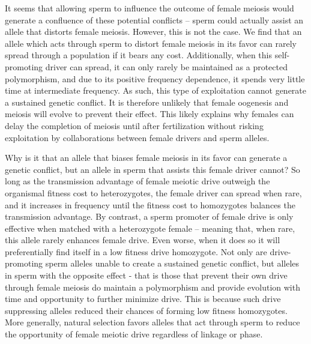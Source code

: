 \documentclass{pnastwo}
\begin{document}
\begin{article}
It seems that allowing sperm to influence the outcome of female meiosis would generate a confluence of these potential conflicts -- 
	sperm could actually assist an allele that distorts female meiosis.
However, this is not the case.
We find that an allele which acts through sperm to distort female meiosis in its favor 
	can rarely spread through a population if it bears any cost. 
Additionally, when this self-promoting driver can spread, it can only rarely 
	be maintained as a protected polymorphism, and due to its positive frequency dependence,  
	it spends very little time at intermediate frequency.
As such, this type of exploitation cannot generate a sustained genetic conflict.
It is therefore unlikely
	that female oogenesis and meiosis will evolve to prevent their effect.  
This likely explains why females can delay the completion of meiosis until after fertilization 
	without risking exploitation by collaborations between female
        drivers and sperm alleles.


Why is it that an allele that biases female meiosis in its favor can generate a genetic conflict, but an allele in sperm that assists this female driver cannot? 
So long as the transmission advantage of female meiotic drive outweigh the organismal fitness cost to heterozygotes, the female driver can spread when rare, and it increases in 		
	frequency until the fitness cost to homozygotes balances the transmission advantage.
By contrast, a sperm promoter of female drive is only effective when matched with a heterozygote female -- meaning that, when rare, this allele rarely enhances female drive. 
Even worse, when it does so it will preferentially find itself in a low fitness drive homozygote. 
Not only are drive-promoting sperm alleles unable to create a sustained genetic conflict, 
	but alleles in sperm with the opposite effect - that is those that prevent their own drive through female meiosis do maintain a polymorphism and 
	provide evolution  with time and opportunity to further minimize drive.
This is because such drive suppressing alleles reduced their chances
of forming low fitness homozygotes. 
More generally, natural selection favors alleles that act through sperm to
 reduce the opportunity of female meiotic drive regardless of linkage or phase. 
 

\end{article}
\end{document}

